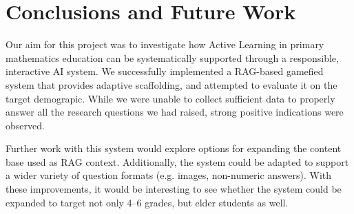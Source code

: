 \section{Conclusions and Future Work}


Our aim for this project was to investigate how Active Learning in primary mathematics education can be systematically supported through a responsible, interactive AI system. We successfully implemented a RAG-based gamefied system that provides adaptive scaffolding, and attempted to evaluate it on the target demograpic.
While we were unable to collect sufficient data to properly answer all the research questions we had raised, strong positive indications were observed. 

Further work with this system would explore options for expanding the content base used as RAG context. Additionally, the system could be adapted to support a wider variety of question formats (e.g. images, non-numeric answers). With these improvements, it would be interesting to see whether the system could be expanded to target not only 4--6 grades, but elder students as well.
